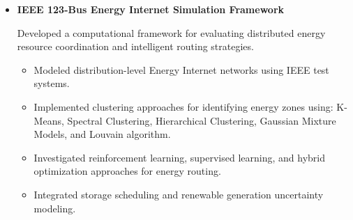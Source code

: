 \documentclass[letter,20pt]{article}
\begin{document}
\begin{itemize}
Developed data-driven forecasting models for short-term photovoltaic generation prediction.



\begin{itemize}
[
noitemsep,
leftmargin=4ex
]


\item
Processed historical SCADA and meteorological time-series data.

\item
Engineered temporal features including hour, day, seasonality, lagged power values, solar irradiance, and environmental parameters.

\item
Implemented machine learning models using Python-based frameworks.

\item
Evaluated forecasting performance using statistical error metrics.

\end{itemize}



\vspace{10pt}



\item[]
\textbf{
IEEE 123-Bus Energy Internet Simulation Framework
}



\vspace{3pt}


Developed a computational framework for evaluating distributed energy resource coordination and intelligent routing strategies.



\begin{itemize}
[
noitemsep,
leftmargin=4ex
]


\item
Modeled distribution-level Energy Internet networks using IEEE test systems.

\item
Implemented clustering approaches for identifying energy zones using:
K-Means, Spectral Clustering, Hierarchical Clustering, Gaussian Mixture Models, and Louvain algorithm.

\item
Investigated reinforcement learning, supervised learning, and hybrid optimization approaches for energy routing.

\item
Integrated storage scheduling and renewable generation uncertainty modeling.


\end{itemize}
\end{itemize}
\end{document}
